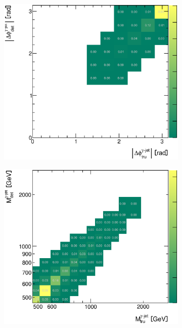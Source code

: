 \documentclass[12pt, twoside]{article}
\numberwithin{equation}{section}
\numberwithin{figure}{section}
\newenvironment{changemargin}[2]{%
\begin{list}{}{%
\setlength{\topsep}{0pt}%
\setlength{\leftmargin}{#1}%
\setlength{\rightmargin}{#2}%
\setlength{\listparindent}{\parindent}%
\setlength{\itemindent}{\parindent}%
\setlength{\parsep}{\parskip}%
}%
\item[]}{\end{list}}
\begin{document}
\begin{figure}
\begin{changemargin}{-1.0cm}{-0.75cm}
\begin{changemargin}{-0.75cm}{-1.0cm}
        \vspace{0.2cm}
        \begin{subfigure}[b]{0.37\textwidth}
            \includegraphics[width=\textwidth]{./images/CorrelationMatricesSherpa/REC_vs_HAD-107.eps}
            \subcaption{}
            \label{fig:SherpaCorrelationPhiPhotonJet}
        \end{subfigure}
        \begin{subfigure}[b]{0.37\textwidth}
            \includegraphics[width=\textwidth]{./images/CorrelationMatricesSherpa/REC_vs_HAD-108.eps}

\end{subfigure}
\end{changemargin}
\end{changemargin}
\end{figure}
\end{document}
